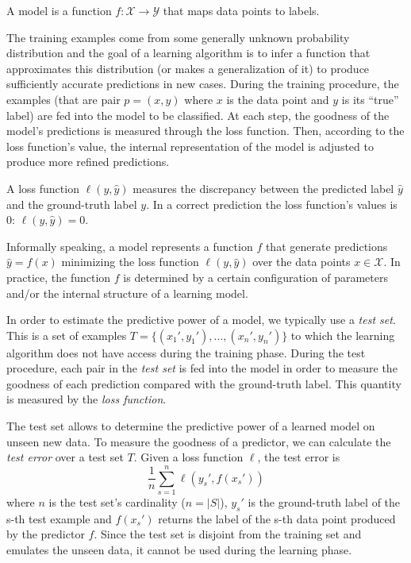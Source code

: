 \begin{definition}[Model]
	A model is a function $f:\mathcal{X} \to \mathcal{Y}$ that maps data points to labels. 
\end{definition}

The training examples come from some generally unknown probability distribution and the goal of a learning algorithm is to infer a function that approximates this distribution (or makes a generalization of it) to produce sufficiently accurate predictions in new cases. During the training procedure, the examples (that are pair $p = (x, y)$ where $x$ is the data point and $y$ is its ``true'' label) are fed into the model to be classified. At each step, the goodness of the model's predictions is measured through the loss function. Then, according to the loss function's value, the internal representation of the model is adjusted to produce more refined predictions.

\begin{definition}
	A loss function $\ell(y, \hat y)$ measures the discrepancy between the predicted label $\hat y$ and the ground-truth label $y$. In a correct prediction the loss function's values is $0$: $\ell (y, \hat y) = 0$.
\end{definition}

Informally speaking, a model represents a function $f$ that generate predictions $\hat y = f(x)$ minimizing the loss function $\ell(y, \hat y)$ over the data points $x \in \mathcal{X}$. In practice, the function $f$ is determined by a certain configuration of parameters and/or the internal structure of a learning model.

In order to estimate the predictive power of a model, we typically use a \textit{test set}. This is a set of examples $T=\{(x_1', y_1'), ..., (x_n', y_n')\}$ to which the learning algorithm does not have access during the training phase. During the test procedure, each pair in the \textit{test set} is fed into the model in order to measure the goodness of each prediction compared with the ground-truth label. This quantity is measured by the \textit{loss function}. 

The test set allows to determine the predictive power of a learned model on unseen new data. To measure the goodness of a predictor, we can calculate the \textit{test error} over a test set $T$. Given a loss function $\ell$, the test error is
\begin{equation}
\frac{1}{n} \sum_{s=1}^{n}\ell(y_s', f(x_s'))
\end{equation}
where $n$ is the test set's cardinality ($n = |S|$), $y_s'$ is the ground-truth label of the s-th test example and $f(x_s')$ returns the label of the s-th data point produced by the predictor $f$. Since the test set is disjoint from the training set and emulates the unseen data, it cannot be used during the learning phase.

